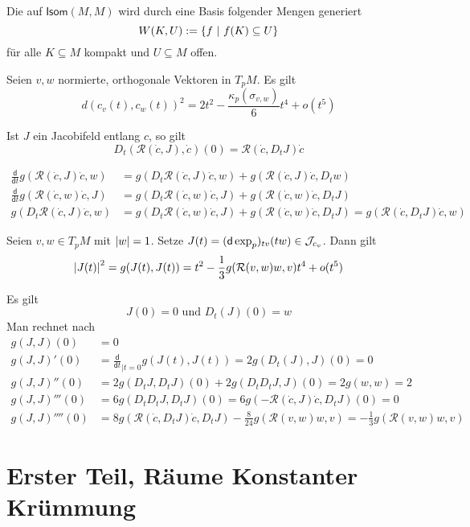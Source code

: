\documentclass{book}
\renewcommand{\d}{\textsf{d}}
\newcommand{\Rc}{\mathcal{R}}
\begin{document}
\Def{}
Die  auf $\textsf{Isom}(M,M)$ wird durch eine Basis folgender Mengen generiert
\[ W(K,U) := \set{f}{ f(K) \subseteq U } \]
für alle $K \subseteq M$ kompakt und $ U \subseteq M$ offen.

Seien $v,w$ normierte, orthogonale Vektoren in $T_pM$. Es gilt
\[ d(c_v(t), c_w(t))^2 = 2t^2 - \frac{\kappa_p(\sigma_{v,w})}{6} t^4 + o(t^5)  \]

\Lem{}
Ist $J$ ein Jacobifeld entlang $c$, so gilt
\[ D_t(\Rc (\dot{c}, J), \dot{c})(0) = \Rc (\dot{c}, D_tJ)\dot{c}  \]
\begin{Beweis}{}
\begin{align*}
\frac{\d}{\d t} g(\Rc(\dot{c} , J) \dot{c}, w ) &= g(D_t \Rc(\dot{c}, J) \dot{c}, w ) + g(\Rc (\dot{c}, J) \dot{c}, D_tw )\\
\frac{\d}{\d t} g(\Rc(\dot{c} , w) \dot{c}, J ) &= g(D_t \Rc(\dot{c}, w) \dot{c}, J ) + g(\Rc (\dot{c}, w) \dot{c}, D_tJ )\\
g(D_t \Rc(\dot{c}, J) \dot{c}, w ) &= g(D_t \Rc(\dot{c}, w) \dot{c}, J ) + g(\Rc(\dot{c}, w) \dot{c}, D_tJ ) =  g(\Rc(\dot{c}, D_tJ) \dot{c}, w )
\end{align*}
\end{Beweis}


\Prop{}
Seien $v,w \in T_pM$ mit $\left|w\right| = 1$. Setze $J(t) = (\d \exp_p)_{tv}(tw) \in \J_{c_v}$. Dann gilt
\[ \bet{J(t)}^2 = g(J(t), J(t)) = t^2 - \frac{1}{3} g(\Rc(v,w)w, v)t^4 + o(t^5) \]

\begin{Beweis}{}
Es gilt
\[ J(0) = 0 \text{ und } D_t(J)(0) = w \]
Man rechnet nach
\begin{align*}
	g(J,J)(0)     & = 0                                                                    \\
	g(J,J)'(0)    & = \frac{\d}{\d t}_{|t = 0} g(J(t), J(t)) = 2g(D_t(J),J) (0) = 0        \\
	g(J,J)''(0)   & = 2g(D_tJ, D_tJ)(0) + 2g(D_tD_tJ,J)(0) = 2g(w,w) = 2                   \\
	g(J,J)'''(0)  & = 6g(D_tD_tJ, D_tJ)(0) = 6g(-\Rc(\dot{c}, J) \dot{c}, D_t J ) (0) = 0  \\
	g(J,J)''''(0) & = 8g(\Rc(\dot{c}, D_tJ )\dot{c}, D_tJ  ) - \frac{8}{24} g(\Rc(v,w)w,v) = - \frac{1}{3}g(\Rc(v,w)w,v)
\end{align*}
\end{Beweis}

\newpage
\chapter{Erster Teil, Räume Konstanter Krümmung}
\end{document}
